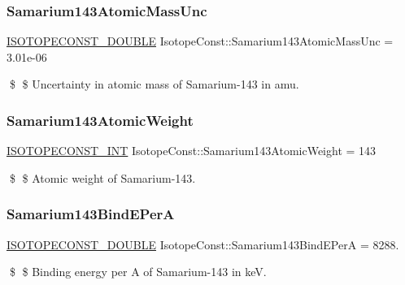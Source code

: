 \subsubsection{\texorpdfstring{Samarium143\+Atomic\+Mass\+Unc}{Samarium143AtomicMassUnc}}
{\footnotesize\ttfamily \mbox{\hyperlink{group___isotope_const-_macros_ga8f45a7272ce02c0b4c65c44636ed719a}{I\+S\+O\+T\+O\+P\+E\+C\+O\+N\+S\+T\+\_\+\+D\+O\+U\+B\+LE}} Isotope\+Const\+::\+Samarium143\+Atomic\+Mass\+Unc = 3.\+01e-\/06}

\$ \$ Uncertainty in atomic mass of Samarium-\/143 in amu. \mbox{\label{group___isotope_const-_samarium-_sm143_ga9c19acc89018e738e3d9ea1ed1a34a4b}} 
\subsubsection{\texorpdfstring{Samarium143\+Atomic\+Weight}{Samarium143AtomicWeight}}
{\footnotesize\ttfamily \mbox{\hyperlink{group___isotope_const-_macros_ga5f18360b3e99483a35c32d789e62621c}{I\+S\+O\+T\+O\+P\+E\+C\+O\+N\+S\+T\+\_\+\+I\+NT}} Isotope\+Const\+::\+Samarium143\+Atomic\+Weight = 143}

\$ \$ Atomic weight of Samarium-\/143. \mbox{\label{group___isotope_const-_samarium-_sm143_ga0d35dfa458c94e8a3b63bf005bacadb2}} 
\subsubsection{\texorpdfstring{Samarium143\+Bind\+E\+PerA}{Samarium143BindEPerA}}
{\footnotesize\ttfamily \mbox{\hyperlink{group___isotope_const-_macros_ga8f45a7272ce02c0b4c65c44636ed719a}{I\+S\+O\+T\+O\+P\+E\+C\+O\+N\+S\+T\+\_\+\+D\+O\+U\+B\+LE}} Isotope\+Const\+::\+Samarium143\+Bind\+E\+PerA = 8288.}

\$ \$ Binding energy per A of Samarium-\/143 in keV. \mbox{\label{group___isotope_const-_samarium-_sm143_ga03e55bdb99f2ccad567dc17bb8da9786}} 
